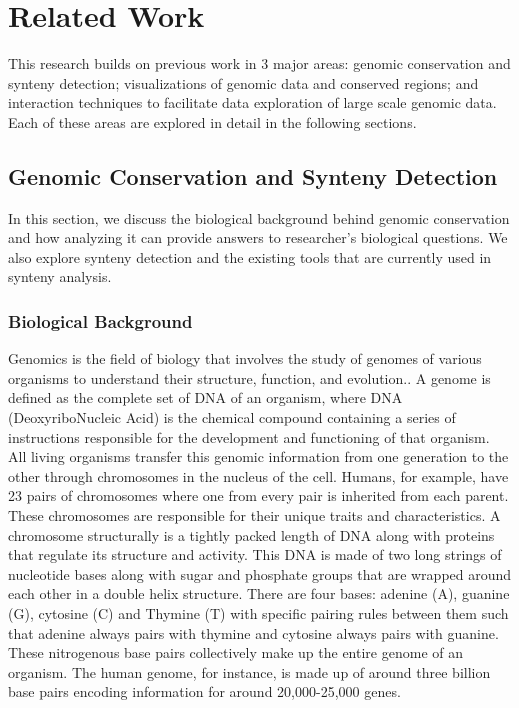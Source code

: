 \chapter{Related Work}

This research builds on previous work in 3 major areas:  genomic conservation and synteny detection; visualizations of genomic data and conserved regions; and interaction techniques to facilitate data exploration of large scale genomic data. Each of these areas are explored in detail in the following sections.

\section{Genomic Conservation and Synteny Detection}
In this section, we discuss the biological background behind genomic conservation and how analyzing it can provide answers to researcher's biological questions. We also explore synteny detection and the existing tools that are currently used in synteny analysis.

\subsection{Biological Background}

Genomics is the field of biology that involves the study of genomes of various organisms to understand their structure, function, and evolution.\cite{world2002genomics}. A genome is defined as the complete set of DNA of an organism, where DNA (DeoxyriboNucleic Acid) is the chemical compound containing a series of instructions responsible for the development and functioning of that organism\cite{genomegov}. All living organisms transfer this genomic information from one generation to the other through chromosomes in the nucleus of the cell. Humans, for example, have 23 pairs of chromosomes where one from every pair is inherited from each parent. These chromosomes are responsible for their unique traits and characteristics. A chromosome structurally is a tightly packed length of DNA along with proteins that regulate its structure and activity. This DNA is made of two long strings of nucleotide bases along with sugar and phosphate groups that are wrapped around each other in a double helix structure. There are four bases: adenine (A), guanine (G), cytosine (C) and Thymine (T) with specific pairing rules between them such that adenine always pairs with thymine and cytosine always pairs with guanine. These nitrogenous base pairs collectively make up the entire genome of an organism\cite{ussery2009computing}. The human genome, for instance, is made up of around three billion base pairs encoding information for around 20,000-25,000 genes\cite{international2004finishing}. 


